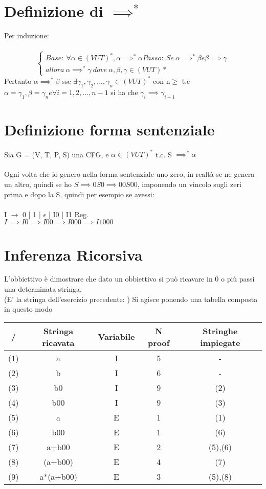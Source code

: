 \documentclass[12pt, a4paper, openany, oneside]{book}
\begin{document}
\section{Definizione di $\implies ^{*}$}
Per induzione: \\ \\
$$\begin{cases}
	Base: ~\forall \alpha \in (V U T)^{*}, \alpha \implies ^{*} \alpha
	Passo: ~Se~ \alpha \implies ^{*} \beta e \beta \implies \gamma \\
			allora~ \alpha \implies ^{*} \gamma ~ dove ~ \alpha, \beta, \gamma 
			\in (V U T)*
\end{cases}$$
Pertanto $\alpha \implies ^{*} \beta$ sse $\exists \gamma _{1}, \gamma _{2}, 
..., \gamma _{n} \in (VUT)^{*}$ con n$\geq$ t.c
$\alpha = \gamma _{1}, \beta = \gamma _{n} e \forall i = 1, 2, ..., n-1$ si ha che
$\gamma _{i} \implies \gamma _{i+1}$ 
\section{Definizione forma sentenziale}
Sia G = (V, T, P, S) una CFG, e $\alpha \in (VUT)^{*}$ t.c. S $\implies ^{*} \alpha$ \\ \\
Ogni volta che io genero nella forma sentenziale uno zero, in realtà se ne 
genera un altro, quindi se ho $S \implies 0S0 \implies 00S00$, imponendo un vincolo
sugli zeri prima e dopo la S, quindi per esempio se avessi: \\ \\
I $\to$ 0 | 1 | $\epsilon$ | I0 | I1 Reg. \\
$I \implies I0 \implies I00 \implies I000 \implies I1000 $
\section{Inferenza Ricorsiva}
L'obbiettivo è dimostrare che dato un obbiettivo si può ricavare in 0 o più passi
una determinata stringa. \\ (E' la stringa dell'esercizio precedente: )
Si agisce ponendo una tabella composta in questo modo 
\begin{center}
\begin{tabular}{ |c|c|c|c|c| } 
 \hline
 / & Stringa ricavata & Variabile & N proof & Stringhe impiegate\\
 \hline
 (1) & a & I & 5 & - \\
 (2) & b & I & 6 & -  \\
 (3) & b0 & I & 9 & (2)\\
 (4) & b00 & I & 9 & (3)\\
 (5) & a & E & 1 & (1)\\
 (6) & b00 & E & 1 & (6)\\
 (7) & a+b00 & E & 2 & (5),(6)\\
 (8) & (a+b00) & E & 4 & (7)\\
 (9) & a*(a+b00) & E & 3 & (5),(8)\\
 \hline
\end{tabular}
\end{center}
\end{document}
